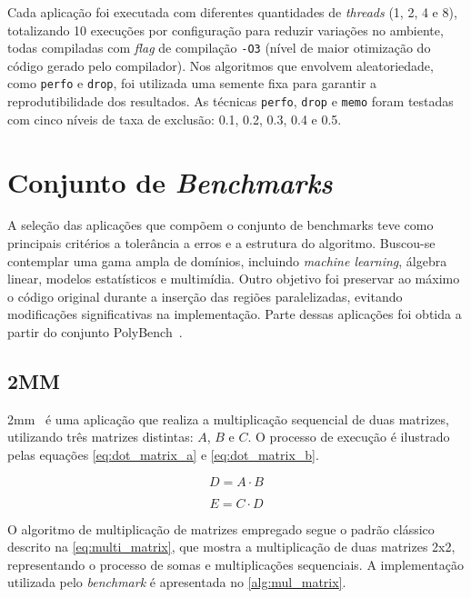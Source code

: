 Cada aplicação foi executada com diferentes quantidades de \textit{threads} (1, 2, 4 e 8), totalizando 10 execuções por configuração para reduzir variações no ambiente, todas compiladas com \textit{flag} de compilação \texttt{-O3} (nível de maior otimização do código gerado pelo compilador). Nos algoritmos que envolvem aleatoriedade, como \texttt{perfo} e \texttt{drop}, foi utilizada uma semente fixa para garantir a reprodutibilidade dos resultados. As técnicas \texttt{perfo}, \texttt{drop} e \texttt{memo} foram testadas com cinco níveis de taxa de exclusão: 0.1, 0.2, 0.3, 0.4 e 0.5.

\section{Conjunto de \textit{Benchmarks}}\label{sec:benchmark}

A seleção das aplicações que compõem o conjunto de benchmarks teve como principais critérios a tolerância a erros e a estrutura do algoritmo. Buscou-se contemplar uma gama ampla de domínios, incluindo \textit{machine learning}, álgebra linear, modelos estatísticos e multimídia. Outro objetivo foi preservar ao máximo o código original durante a inserção das regiões paralelizadas, evitando modificações significativas na implementação. Parte dessas aplicações foi obtida a partir do conjunto PolyBench~\cite{polybench}.

\subsection{2MM}\label{subsec:2mm}

2mm~\cite{polybench} é uma aplicação que realiza a multiplicação sequencial de duas matrizes, utilizando três matrizes distintas: $A$, $B$ e $C$. O processo de execução é ilustrado pelas equações \autoref{eq:dot_matrix_a} e \autoref{eq:dot_matrix_b}.

\begin{equation}
	\label{eq:dot_matrix_a}
	D = A \cdot B
\end{equation}

\begin{equation}
	\label{eq:dot_matrix_b}
	E = C \cdot D
\end{equation}

O algoritmo de multiplicação de matrizes empregado segue o padrão clássico~\cite{axler2015} descrito na \autoref{eq:multi_matrix}, que mostra a multiplicação de duas matrizes 2x2, representando o processo de somas e multiplicações sequenciais. A implementação utilizada pelo \textit{benchmark} é apresentada no \autoref{alg:mul_matrix}.

